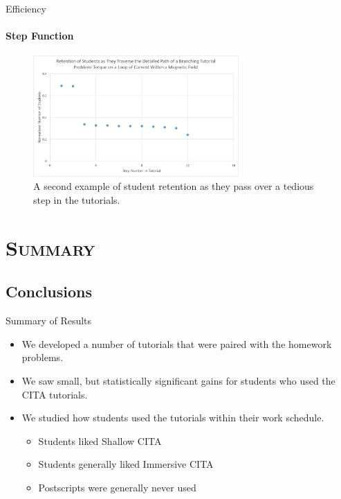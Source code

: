 \documentclass[xcolor=x11names,compress]{beamer}
\begin{document}
\begin{frame}{Efficiency}
	\framesubtitle{Step Function}
	\begin{figure}
		\centering
		\includegraphics[width=0.7\textwidth]{img/step_function_2.png}
		\caption{A second example of student retention as they pass over a tedious step in the tutorials.}
		\label{fig:step_function_examples}
	\end{figure}	
\end{frame}


\section{\scshape Summary}

\subsection{Conclusions}

\begin{frame}{Summary of Results}
	\begin{itemize}
		\item We developed a number of tutorials that were paired with the homework problems.
		\item We saw small, but statistically significant gains for students who used the CITA tutorials.
		\item We studied how students used the tutorials within their work schedule.
		\begin{itemize}
			\item Students liked Shallow CITA
			\item Students generally liked Immersive CITA
			\item Postscripts were generally never used
		\end{itemize}
	\end{itemize}
\end{frame}
\end{document}
